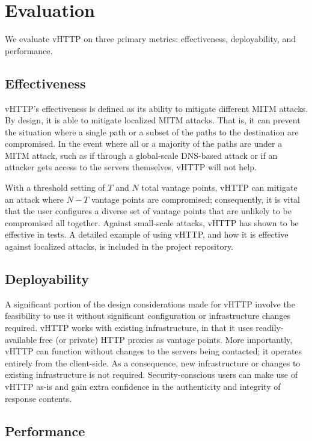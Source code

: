 \section{Evaluation}
\label{sec:eval}

We evaluate vHTTP on three primary metrics: effectiveness, deployability, and
performance.

\subsection{Effectiveness}

vHTTP's effectiveness is defined as its ability to mitigate different MITM
attacks. By design, it is able to mitigate localized MITM attacks. That is, it
can prevent the situation where a single path or a subset of the paths to the
destination are compromised. In the event where all or a majority of the paths
are under a MITM attack, such as if through a global-scale DNS-based attack or
if an attacker gets access to the servers themselves, vHTTP will not help.

With a threshold setting of $T$ and $N$ total vantage points, vHTTP can
mitigate an attack where $N-T$ vantage points are compromised; consequently,
it is vital that the user configures a diverse set of vantage points that are
unlikely to be compromised all together. Against small-scale attacks, vHTTP
has shown to be effective in tests. A detailed example of using vHTTP, and how
it is effective against localized attacks, is included in the project
repository.

\subsection{Deployability}

A significant portion of the design considerations made for vHTTP involve the
feasibility to use it without significant configuration or infrastructure
changes required. vHTTP works with existing infrastructure, in that it uses
readily-available free (or private) HTTP proxies as vantage points. More
importantly, vHTTP can function without changes to the servers being contacted;
it operates entirely from the client-side. As a consequence, new infrastructure
or changes to existing infrastructure is not required. Security-conscious users
can make use of vHTTP as-is and gain extra confidence in the authenticity and
integrity of response contents.

\subsection{Performance}

